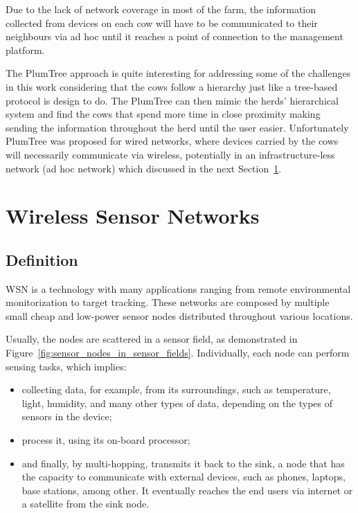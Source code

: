 Due to the lack of network coverage in most of the farm, the information collected from
devices on each cow will have to be communicated to their neighbours via ad hoc until it
reaches a point of connection to the management platform.

The PlumTree approach is quite interesting for addressing some of the challenges in this work
considering that the cows follow a hierarchy just like a tree-based protocol is design to do.
The PlumTree can then mimic the herds' hierarchical system and find the cows that spend more
time in close proximity making sending the information throughout the herd until the user
easier. Unfortunately PlumTree was proposed for wired networks, where devices carried
by the cows will necessarily communicate via wireless, potentially in an infrastructure-less
network (ad hoc network) which discussed in the next Section~\ref{sec:wireless_sensor_networks}.


\section{Wireless Sensor Networks}
\label{sec:wireless_sensor_networks}

\subsection{Definition}
\label{subsec:wsn_definition}
\Gls{WSN} is a technology with many applications ranging from remote environmental monitorization
to target tracking. These networks are composed by multiple small cheap and low-power sensor
nodes distributed throughout various locations.

Usually, the nodes are scattered in a sensor field, as demonstrated in Figure~\ref{fig:sensor_nodes_in_sensor_fields}.
Individually, each node can perform sensing tasks, which implies:
\begin{itemize}
      \item collecting data, for example, from its surroundings, such as temperature, light,
            humidity, and many other types of data, depending on the types of sensors in the
            device;
      \item process it, using its on-board processor;
      \item and finally, by multi-hopping, transmits it back to the sink, a node that has
            the capacity to communicate with external devices, such as phones, laptops, base
            stations, among other. It eventually reaches the end users via internet or a
            satellite from the sink node\cite{Akyildiz2002}.
\end{itemize}

